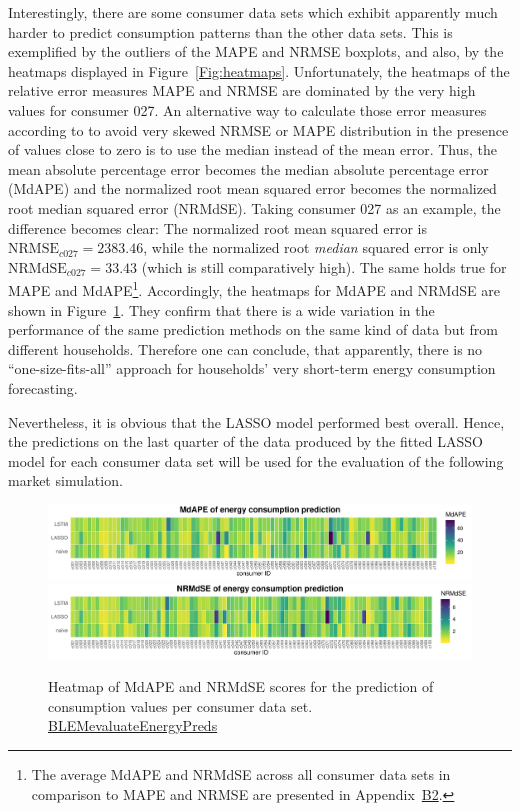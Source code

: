 Interestingly, there are some consumer data sets which exhibit apparently much harder to predict consumption patterns than the other data sets. This is exemplified by the outliers of the MAPE and NRMSE boxplots, and also, by the heatmaps displayed in Figure~\ref{Fig:heatmaps}. Unfortunately, the heatmaps of the relative error measures MAPE and NRMSE are dominated by the very high values for consumer 027. An alternative way to calculate those error measures according to \citet{Hyndman:2006} to avoid very skewed NRMSE or MAPE distribution in the presence of values close to zero is to use the median instead of the mean error. Thus, the mean absolute percentage error becomes the median absolute percentage error (MdAPE) and the normalized root mean squared error becomes the normalized root median squared error (NRMdSE). Taking consumer 027 as an example, the difference becomes clear: The normalized root mean squared error is $\text{NRMSE}_{c027}=2383.46$, while the normalized root \emph{median} squared error is only $\text{NRMdSE}_{c027}=33.43$ (which is still comparatively high). The same holds true for MAPE and MdAPE\footnote{The average MdAPE and NRMdSE across all consumer data sets in comparison to MAPE and NRMSE are presented in Appendix~\hyperlink{AppB2:Tables:avg_errM_wMedian}{B2}.}. Accordingly, the heatmaps for MdAPE and NRMdSE are shown in Figure~\ref{Fig:heatmaps_median}. They confirm that there is a wide variation in the performance of the same prediction methods on the same kind of data but from different households. Therefore one can conclude, that apparently, there is no ``one-size-fits-all'' approach for households' very short-term energy consumption forecasting.

Nevertheless, it is obvious that the LASSO model performed best overall. Hence, the predictions on the last quarter of the data produced by the fitted LASSO model for each consumer data set will be used for the evaluation of the following market simulation.
%
\begin{figure}[ht]
 \centering
 \includegraphics[width=\textwidth]{thesis/graphs/evaluation/c_heatmap_MdAPE.pdf}
 \includegraphics[width=\textwidth]{thesis/graphs/evaluation/c_heatmap_NRMdSE.pdf}
\caption[Heatmaps of MdAPE and NRMdSE for consumption values]{Heatmap of MdAPE and NRMdSE scores for the prediction of consumption values per consumer data set. \quantnet\href{https://github.com/QuantLet/BLEM/tree/master/BLEMevaluateEnergyPreds}{BLEMevaluateEnergyPreds}}
\label{Fig:heatmaps_median}
\end{figure}
%



